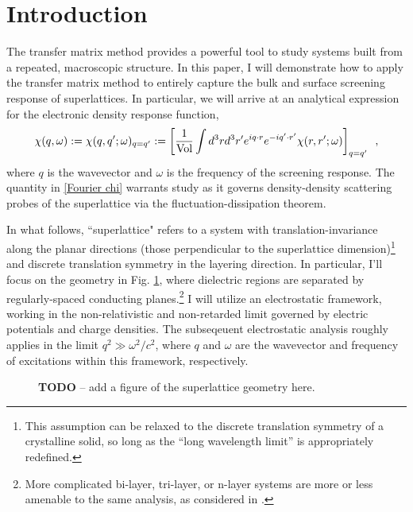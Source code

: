 \section*{Introduction}

The transfer matrix method provides a powerful tool to study systems built from a repeated, macroscopic structure.  In this paper, I will demonstrate how to apply the transfer matrix method to entirely capture the bulk and surface screening response of superlattices.  In particular, we will arrive at an analytical expression for the electronic density response function,
\begin{equation}
    \label{Fourier chi}
    \chi(q,\omega):=\chi(q,q';\omega)_{q=q'}
    :=
    \left[\frac{1}{\text{Vol}}\int d^3 r d^3 r' e^{iq\cdot r} e^{-i q'\cdot r'}\chi(r,r';\omega)\right]_{q=q'}
    \,\,\,,
\end{equation}
where $q$ is the wavevector and $\omega$ is the frequency of the screening response.  The quantity in \eqref{Fourier chi} warrants study as it governs density-density scattering probes of the superlattice via the fluctuation-dissipation theorem.

In what follows, ``superlattice" refers to a system with translation-invariance along the planar directions (those perpendicular to the superlattice dimension)\footnote{This assumption can be relaxed to the discrete translation symmetry of a crystalline solid, so long as the ``long wavelength limit'' is appropriately redefined.} and discrete translation symmetry in the layering direction.  In particular, I'll focus on the geometry in Fig. \ref{figure: superlattice geometry}, where dielectric regions are separated by regularly-spaced conducting planes.\footnote{More complicated bi-layer, tri-layer, or n-layer systems are more or less amenable to the same analysis, as considered in \cite{Cottam1993, Cottam2004}.}  I will utilize an electrostatic framework, working in the non-relativistic and non-retarded limit governed by electric potentials and charge densities.  The subseqeuent electrostatic analysis roughly applies in the limit $q^2\gg \omega^2/c^2$, where $q$ and $\omega$ are the wavevector and frequency of excitations within this framework, respectively.

\begin{figure}
    \centering
    \caption{
    {\bf TODO} -- add a figure of the superlattice geometry here.
    }
    \label{figure: superlattice geometry}
\end{figure}


